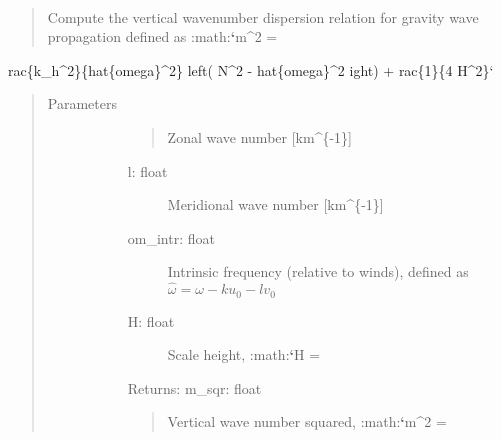 \documentclass[letterpaper,10pt,english]{sphinxmanual}
\begin{document}
\begin{fulllineitems}
\label{\detokenize{stochprop.gravity:stochprop.gravity_waves.m_sqr}}~\begin{quote}

Compute the vertical wavenumber dispersion relation for gravity wave propagation
defined as :math:{\color{red}\bfseries{}{}`}m\textasciicircum{}2 =
\end{quote}

rac\{k\_h\textasciicircum{}2\}\{hat\{omega\}\textasciicircum{}2\} left( N\textasciicircum{}2 - hat\{omega\}\textasciicircum{}2 
ight) + 
rac\{1\}\{4 H\textasciicircum{}2\}{}`
\begin{quote}\begin{description}
\item[{Parameters}] \leavevmode\begin{description}
\item[{}] \leavevmode\begin{quote}

Zonal wave number {[}km\textasciicircum{}\{-1\}{]}
\end{quote}
\begin{description}
\item[{l: float}] \leavevmode
Meridional wave number {[}km\textasciicircum{}\{-1\}{]}

\item[{om\_intr: float}] \leavevmode
Intrinsic frequency (relative to winds), defined as \(\hat{\omega} = \omega - k u_0 - l v_0\)

\item[{H: float}] \leavevmode
Scale height, :math:{\color{red}\bfseries{}{}`}H =

\end{description}

\item[{}] \leavevmode
\item[{}] \leavevmode
\item[{}] \leavevmode
\item[{}] \leavevmode
Returns:
m\_sqr: float
\begin{quote}

Vertical wave number squared, :math:{\color{red}\bfseries{}{}`}m\textasciicircum{}2 =
\end{quote}


\end{description}
\end{description}
\end{quote}
\end{fulllineitems}
\end{document}
